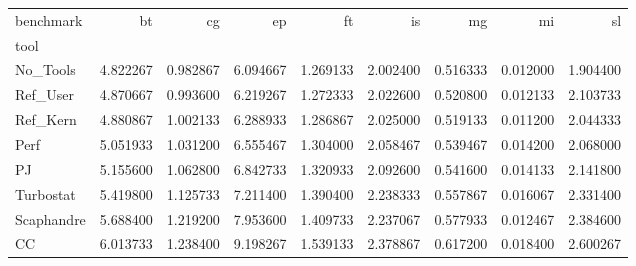 \begin{tabular}{lrrrrrrrr}
\toprule
benchmark & bt & cg & ep & ft & is & mg & mi & sl \\
tool &  &  &  &  &  &  &  &  \\
\midrule
No_Tools & 4.822267 & 0.982867 & 6.094667 & 1.269133 & 2.002400 & 0.516333 & 0.012000 & 1.904400 \\
Ref_User & 4.870667 & 0.993600 & 6.219267 & 1.272333 & 2.022600 & 0.520800 & 0.012133 & 2.103733 \\
Ref_Kern & 4.880867 & 1.002133 & 6.288933 & 1.286867 & 2.025000 & 0.519133 & 0.011200 & 2.044333 \\
Perf & 5.051933 & 1.031200 & 6.555467 & 1.304000 & 2.058467 & 0.539467 & 0.014200 & 2.068000 \\
PJ & 5.155600 & 1.062800 & 6.842733 & 1.320933 & 2.092600 & 0.541600 & 0.014133 & 2.141800 \\
Turbostat & 5.419800 & 1.125733 & 7.211400 & 1.390400 & 2.238333 & 0.557867 & 0.016067 & 2.331400 \\
Scaphandre & 5.688400 & 1.219200 & 7.953600 & 1.409733 & 2.237067 & 0.577933 & 0.012467 & 2.384600 \\
CC & 6.013733 & 1.238400 & 9.198267 & 1.539133 & 2.378867 & 0.617200 & 0.018400 & 2.600267 \\
\bottomrule
\end{tabular}
